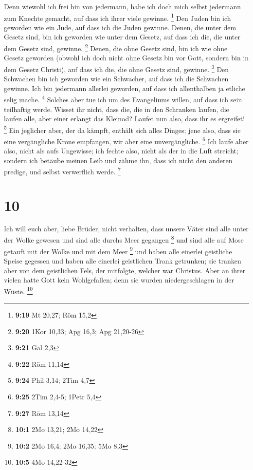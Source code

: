  Denn wiewohl ich frei bin von jedermann, habe ich doch
mich selbst jedermann zum Knechte gemacht, auf dass ich ihrer viele
gewinne. \footnote{\textbf{9:19} Mt 20,27; Röm 15,2}  Den
Juden bin ich geworden wie ein Jude, auf dass ich die Juden gewinne.
Denen, die unter dem Gesetz sind, bin ich geworden wie unter dem Gesetz,
auf dass ich die, die unter dem Gesetz sind, gewinne. \footnote{\textbf{9:20}
  1Kor 10,33; Apg 16,3; Apg 21,20-26}  Denen, die ohne
Gesetz sind, bin ich wie ohne Gesetz geworden (obwohl ich doch nicht
ohne Gesetz bin vor Gott, sondern bin in dem Gesetz Christi), auf dass
ich die, die ohne Gesetz sind, gewinne. \footnote{\textbf{9:21} Gal 2,3}
 Den Schwachen bin ich geworden wie ein Schwacher, auf
dass ich die Schwachen gewinne. Ich bin jedermann allerlei geworden, auf
dass ich allenthalben ja etliche selig mache. \footnote{\textbf{9:22}
  Röm 11,14}  Solches aber tue ich um des Evangeliums
willen, auf dass ich sein teilhaftig werde.  Wisset ihr
nicht, dass die, die in den Schranken laufen, die laufen alle, aber
einer erlangt das Kleinod? Laufet nun also, dass ihr es ergreifet!
\footnote{\textbf{9:24} Phil 3,14; 2Tim 4,7}  Ein
jeglicher aber, der da kämpft, enthält sich alles Dinges; jene also,
dass sie eine vergängliche Krone empfangen, wir aber eine
unvergängliche. \footnote{\textbf{9:25} 2Tim 2,4-5; 1Petr 5,4}
 Ich laufe aber also, nicht als aufs Ungewisse; ich
fechte also, nicht als der in die Luft streicht;  sondern
ich betäube meinen Leib und zähme ihn, dass ich nicht den anderen
predige, und selbst verwerflich werde. \footnote{\textbf{9:27} Röm 13,14}

\hypertarget{section-5}{%
\section{10}\label{section-5}}

 Ich will euch aber, liebe Brüder, nicht verhalten, dass
unsere Väter sind alle unter der Wolke gewesen und sind alle durchs Meer
gegangen \footnote{\textbf{10:1} 2Mo 13,21; 2Mo 14,22} 
und sind alle auf Mose getauft mit der Wolke und mit dem Meer
\footnote{\textbf{10:2} 2Mo 16,4; 2Mo 16,35; 5Mo 8,3}  und
haben alle einerlei geistliche Speise gegessen  und haben
alle einerlei geistlichen Trank getrunken; sie tranken aber von dem
geistlichen Fels, der mitfolgte, welcher war Christus. 
Aber an ihrer vielen hatte Gott kein Wohlgefallen; denn sie wurden
niedergeschlagen in der Wüste. \footnote{\textbf{10:5} 4Mo 14,22-32}

